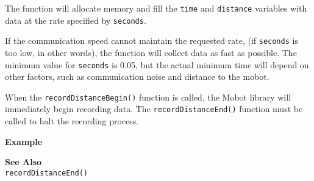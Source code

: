The function will allocate memory and fill the \texttt{time} and \texttt{distance} variables with data
at the rate specified by \texttt{seconds}. 

If the communication speed cannot maintain 
the requested rate, (if \texttt{seconds} is too low, in other words), the function will
collect data as fast as possible. The minimum value for \texttt{seconds} is 0.05, but
the actual minimum time will depend on other factors, such as communication noise and
distance to the mobot.

When the \texttt{recordDistanceBegin()} function is called, the Mobot library will 
immediately begin recording data. The \texttt{recordDistanceEnd()} function
must be called to halt the recording process. 

\noindent
{\bf Example}\\
\noindent

\noindent
{\bf See Also}\\
\texttt{recordDistanceEnd()} \\
